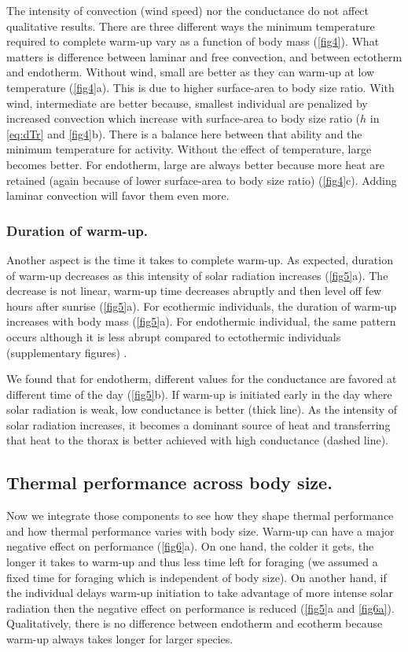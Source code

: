 The intensity of convection (wind speed) nor the conductance do not affect qualitative results.
There are three different ways the minimum temperature required to complete warm-up vary as a function of body mass (\cref{fig4}).
What matters is difference between laminar and free convection, and between ectotherm  and endotherm.
Without wind, small are better as they can warm-up at low temperature (\cref{fig4}a).
This is due to higher surface-area to body size ratio.
With wind, intermediate are better because, smallest individual are penalized by increased convection  which increase with surface-area to body size ratio ($h$ in \cref{eq:dTr} and \cref{fig4}b).
There is  a balance here between that ability and the minimum temperature for activity. 
Without the effect of temperature, large becomes better.
For endotherm, large are always better because more heat are retained (again because of lower surface-area to body size ratio) (\cref{fig4}c).
Adding laminar convection will favor them even more.
\subsubsection*{Duration of warm-up.}
Another aspect is the time it takes to complete warm-up.
As expected, duration of warm-up decreases as this intensity of solar radiation increases (\cref{fig5}a).
The decrease is not linear, warm-up time decreases abruptly and then level off few hours after sunrise (\cref{fig5}a).
For ecothermic individuals, the duration of warm-up increases with body mass (\cref{fig5}a).
For endothermic individual, the same pattern occurs although it is less abrupt compared to ectothermic individuals (supplementary figures) .

We found that for endotherm, different values for the conductance are favored at different time of the day (\cref{fig5}b).
If warm-up is initiated early in the day where solar radiation is weak, low conductance is better (thick line).
As the intensity of solar radiation increases, it becomes a dominant source of heat and transferring that heat to the thorax is better achieved with high conductance (dashed line).

\subsection*{Thermal performance across body size.}
Now we integrate those components to see how they shape thermal performance and how thermal performance varies with body size.
Warm-up can have a major negative effect on performance (\cref{fig6}a).
On one hand, the colder it gets, the longer it takes to warm-up and thus less time left for foraging (we assumed a fixed time for foraging which is independent of body size).
On another hand, if the individual delays warm-up initiation to take advantage of more intense solar radiation then the negative effect on performance is reduced (\cref{fig5}a and \cref{fig6a}).
Qualitatively, there is no difference between endotherm and ecotherm because warm-up always takes longer for larger species. 

